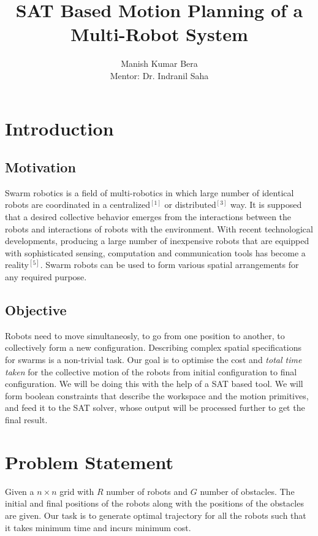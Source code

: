 \documentclass{article}[11pt]
\title{SAT Based Motion Planning of a Multi-Robot System}
\author{Manish Kumar Bera \\
Mentor: Dr. Indranil Saha
}
\begin{document}
	\maketitle

	\section{Introduction}
		\subsection{Motivation}
		Swarm robotics is a field of multi-robotics in which large number of identical robots are coordinated in a centralized$^{[1]}$ or distributed$^{[3]}$ way.
		It is supposed that a desired collective behavior emerges from the interactions between the robots and interactions of robots with the environment.
		With  recent  technological  developments, producing a large number of inexpensive robots that are  equipped  with  sophisticated  sensing,  computation and communication tools has become a reality$^{[5]}$. 
		Swarm robots can be used to form various spatial arrangements for any required purpose.
		\subsection{Objective}
		Robots need to move simultaneosly, to go from one position to another, to collectively
		form a new configuration. Describing complex spatial specifications for swarms is a
		non-trivial task. Our goal is to optimise the cost and \textit{total time taken} for the collective motion of the robots
		from initial configuration to final configuration. We will be doing this with the help
		of a SAT based tool. We will form boolean constraints that describe the workspace and the
		motion primitives, and feed it to the SAT solver, whose output will be processed further
		to get the final result.




	\section{Problem Statement}
		Given a $n \times n$ grid with $R$ number of robots and $G$ number of obstacles. The initial and final positions of the robots along with the positions of the obstacles are given. Our task is to generate optimal trajectory for all the robots such that it takes minimum time and incurs minimum cost. 
\end{document}
